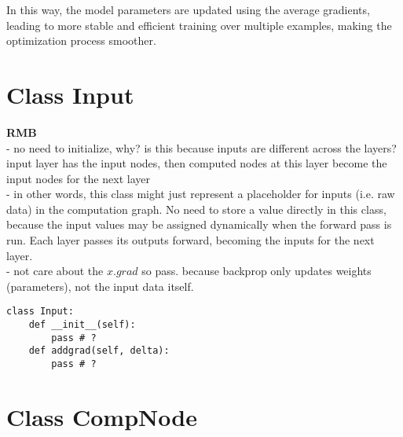\documentclass{article}
\begin{document}
In this way, the model parameters are updated using the average gradients, leading to more stable and efficient training over multiple examples, making the optimization process smoother.

\section{Class Input}

\textbf{RMB}\\
- no need to initialize, why? is this because inputs are different across the layers? input layer has the input nodes, then computed nodes at this layer become the input nodes for the next layer\\
- in other words, this class might just represent a placeholder for inputs (i.e. raw data) in the computation graph. No need to store a value directly in this class, because the input values may be assigned dynamically when the forward pass is run. Each layer passes its outputs forward, becoming the inputs for the next layer. \\
- not care about the $x.grad$ so pass. because backprop only updates weights (parameters), not the input data itself. 
\begin{verbatim}
class Input:
    def __init__(self):
        pass # ?
    def addgrad(self, delta):
        pass # ?
\end{verbatim}

\section{Class CompNode}
\end{document}
